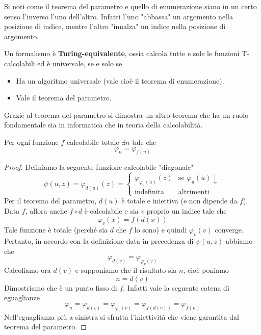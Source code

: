 Si noti come il teorema del parametro e quello di enumerazione
siano in un certo senso l'inverso l'uno dell'altro. Infatti
l'uno "abbassa" un argomento nella posizione di indice, mentre
l'altro "innalza" un indice nella posizione di argomento.

\begin{theorem}[Espressività]
	Un formalismo è \textbf{Turing-equivalente}, ossia calcola
	tutte e sole le funzioni T-calcolabili ed è universale, se
	e solo se
	\begin{itemize}
		\item Ha un algoritmo universale (vale cioè il teorema
		      di enumerazione).
		\item Vale il teorema del parametro.
	\end{itemize}
\end{theorem}

Grazie al teorema del parametro si dimostra un altro teorema
che ha un ruolo fondamentale sia in informatica che in teoria
della calcolabilità.

\begin{theorem} \label{th: punto_fisso}
	Per ogni funzione $f$ calcolabile totale $\exists n$ tale
	che
	\[ \varphi_n = \varphi_{f(n)} \]
	\begin{proof}
		Definiamo la seguente funzione calcolabile "diagonale"
		\[
			\psi (u, z) = \varphi_{d(u)} (z) =
			\begin{cases}
				\varphi_{\varphi_u (u)} (z) &
				\text{se } \varphi_u (u) \downarrow \\
				\text{indefinita}           &
				\text{altrimenti}
			\end{cases}
		\]
		Per il teorema del parametro, $d(u)$ è totale e
		iniettiva (e non dipende da $f$). Data $f$, allora
		anche $f \circ d$ è calcolabile e sia $v$ proprio
		un indice tale che
		\[ \varphi_v(x) = f(d(x)) \]
		Tale funzione è totale (perché sia $d$ che $f$ lo sono)
		e quindi $\varphi_v (v)$ converge. Pertanto, in accordo
		con la definizione data in precedenza di $\psi (u,z)$
		abbiamo che
		\[ \varphi_{d(v)} = \varphi_{\varphi_v(v)} \]
		Calcoliamo ora $d(v)$ e supponiamo che il risultato sia
		$n$, cioè poniamo
		\[ n = d(v) \]
		Dimostriamo che è un punto fisso di $f$. Infatti vale
		la seguente catena di eguaglianze
		\[
			\varphi_n  = \varphi_{d(v)}
			= \varphi_{\varphi_v (v)}
			= \varphi_{f(d(v))}
			= \varphi_{f(n)}
		\]
		Nell'eguaglianza più a sinistra si sfrutta l'iniettività
		che viene garantita dal teorema del parametro.
	\end{proof}
\end{theorem}

